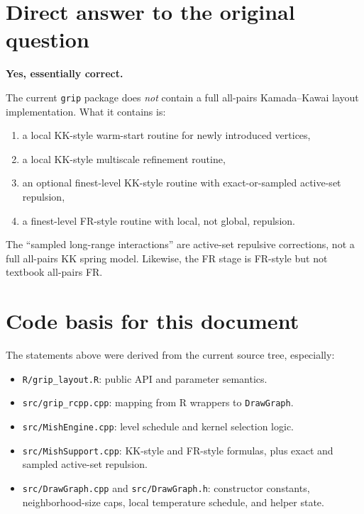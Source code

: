 \documentclass[11pt]{article}
\begin{document}
\section{Direct answer to the original question}

\textbf{Yes, essentially correct.}

The current \texttt{grip} package does \emph{not} contain a full all-pairs
Kamada--Kawai layout implementation. What it contains is:
\begin{enumerate}[leftmargin=1.5em]
\item a local KK-style warm-start routine for newly introduced vertices,
\item a local KK-style multiscale refinement routine,
\item an optional finest-level KK-style routine with exact-or-sampled active-set repulsion,
\item a finest-level FR-style routine with local, not global, repulsion.
\end{enumerate}

The ``sampled long-range interactions'' are active-set repulsive corrections,
not a full all-pairs KK spring model. Likewise, the FR stage is FR-style but not
textbook all-pairs FR.

\section{Code basis for this document}

The statements above were derived from the current source tree, especially:
\begin{itemize}[leftmargin=1.5em]
\item \texttt{R/grip\_layout.R}: public API and parameter semantics.
\item \texttt{src/grip\_rcpp.cpp}: mapping from R wrappers to \texttt{DrawGraph}.
\item \texttt{src/MishEngine.cpp}: level schedule and kernel selection logic.
\item \texttt{src/MishSupport.cpp}: KK-style and FR-style formulas, plus exact
and sampled active-set repulsion.
\item \texttt{src/DrawGraph.cpp} and \texttt{src/DrawGraph.h}: constructor
constants, neighborhood-size caps, local temperature schedule, and helper state.
\end{itemize}
\end{document}
